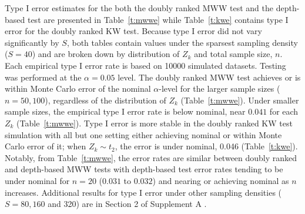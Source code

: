 \documentclass[12pt]{article}
\theoremstyle{plain}
\begin{document}

	Type I error estimates for the both the doubly ranked MWW test and the depth-based test are presented in Table~\ref{t:mwwe} while Table~\ref{t:kwe} contains type I error for the doubly ranked KW test. Because type I error did not vary significantly by $S$, both tables contain values under the sparsest sampling density ($S = 40$) and are broken down by distribution of $Z_k$ and total sample size, $n$. Each empirical type I error rate is based on 10000 simulated datasets. Testing was performed at the $\alpha = 0.05$ level. The doubly ranked MWW test achieves or is within Monte Carlo error of the nominal $\alpha$-level for the larger sample sizes ($n = 50, 100$), regardless of the distribution of $Z_k$ (Table~\ref{t:mwwe}). Under smaller sample sizes, the empirical type I error rate is below nominal, near $0.041$ for each $Z_k$ (Table~\ref{t:mwwe}). Type I error is more stable in the doubly ranked KW test simulation with all but one setting either achieving nominal or within Monte Carlo error of it; when $Z_k \sim t_2$, the error is under nominal, 0.046 (Table~\ref{t:kwe}). Notably, from Table~\ref{t:mwwe}, the error rates are similar between doubly ranked and depth-based MWW tests with depth-based test error rates tending to be under nominal for $n = 20$ ($0.031$ to $0.032$) and nearing or achieving nominal as $n$ increases. Additional results for type I error under other sampling densities ($S = 80, 160$ and 320) are in Section 2 of Supplement A \citep{DRTSup2024A}.
\end{document}

